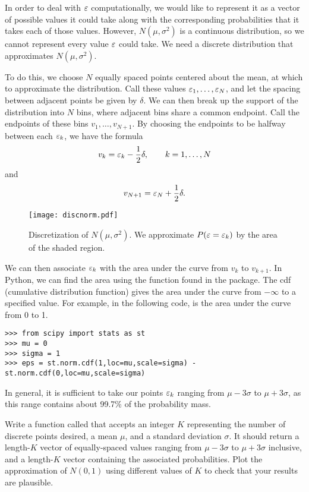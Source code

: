 In order to deal with $\varepsilon$ computationally, we would like to represent it as a vector of possible values
it could take along with the corresponding probabilities that it takes each of those values.  However,
$N(\mu,\sigma^2)$ is a continuous distribution, so we cannot represent every value $\varepsilon$ could take.
We need a discrete distribution that approximates $N(\mu,\sigma^2)$.

To do this, we choose $N$ equally spaced points centered about the mean, at which to approximate the
distribution. Call these values $\varepsilon_1,\ldots,\varepsilon_N$, and let the spacing between adjacent points be
given by $\delta$.
We can then break up the support of the distribution into $N$ bins, where adjacent bins share a common
endpoint. Call the endpoints of these bins $v_1,\ldots,v_{N+1}$. By choosing the endpoints to be
halfway between each $\varepsilon_k$, we have the formula
\[
v_k = \varepsilon_k - \frac{1}{2}\delta, \qquad k=1,\ldots,N
\]
and
\[
v_{N+1} = \varepsilon_N + \frac{1}{2}\delta.
\]

\begin{figure}[h!]
\label{stoch1_fig1}
\begin{center}
\texttt{[image: discnorm.pdf]}
\end{center}
\caption{Discretization of $N(\mu,\sigma^2)$.  We approximate $P(\varepsilon = \varepsilon_k)$ by the area of the shaded region.}
\end{figure}

We can then associate $\varepsilon_k$ with the area under the curve from $v_k$ to $v_{k+1}$.
In Python, we can find the area using the function  found in the  package.
The cdf (cumulative distribution function) gives the area under the curve from $-\infty$ to a specified value.
For example, in the following code,  is the area under the curve from 0 to 1.

\begin{lstlisting}
>>> from scipy import stats as st
>>> mu = 0
>>> sigma = 1
>>> eps = st.norm.cdf(1,loc=mu,scale=sigma) - st.norm.cdf(0,loc=mu,scale=sigma)
\end{lstlisting}

In general, it is sufficient to take our points $\varepsilon_k$ ranging from $\mu - 3\sigma$ to $\mu + 3\sigma$, as this
range contains about 99.7\% of the probability mass.

\begin{problem}
Write a function called  that accepts an integer $K$ representing the number of discrete points
desired, a mean $\mu$, and a standard deviation $\sigma$. It should return a length-$K$ vector of equally-spaced
values ranging from $\mu - 3\sigma$ to $\mu + 3\sigma$ inclusive,
and a length-$K$ vector containing the associated probabilities.
Plot the approximation of $N(0,1)$ using different values of $K$ to check that your results are plausible.
\end{problem}

